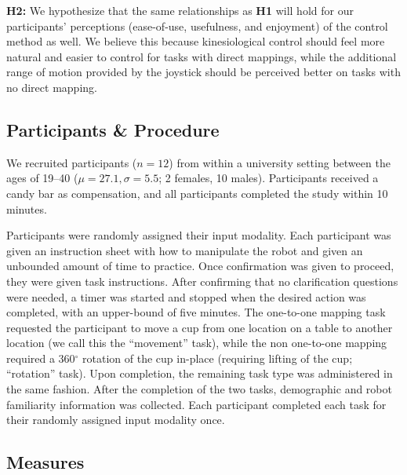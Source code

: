 \documentclass{sigchi}
\begin{document}
\textbf{H2:} We hypothesize that the same relationships as \textbf{H1} will hold for our participants' perceptions (ease-of-use, usefulness, and enjoyment) of the control method as well. We believe this because kinesiological control should feel more natural and easier to control for tasks with direct mappings, while the additional range of motion provided by the joystick should be perceived better on tasks with no direct mapping. 


\subsection{Participants \& Procedure}

We recruited participants ($n=12$) from within a university setting between the ages of 19--40 ($\mu=27.1, \sigma=5.5$; 2 females, 10 males). Participants received a candy bar as compensation, and all participants completed the study within 10 minutes. 

Participants were randomly assigned their input modality.  Each participant was given an instruction sheet with how to manipulate the robot and given an unbounded amount of time to practice. Once confirmation was given to proceed, they were given task instructions.  After confirming that no clarification questions were needed, a timer was started and stopped when the desired action was completed, with an upper-bound of five minutes.  The one-to-one mapping task requested the participant to move a cup from one location on a table to another location (we call this the ``movement'' task), while the non one-to-one mapping required a 360$^{\circ}$ rotation of the cup in-place (requiring lifting of the cup; ``rotation'' task).  Upon completion, the remaining task type was administered in the same fashion.  After the completion of the two tasks, demographic and robot familiarity information was collected. Each participant completed each task for their randomly assigned input modality once. 

\subsection{Measures}
\end{document}
